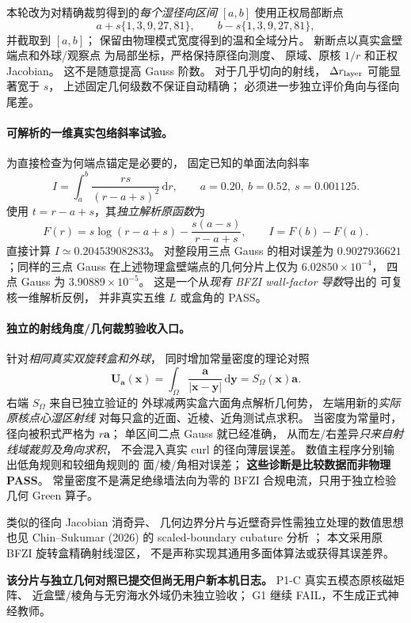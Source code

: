 本轮改为对精确裁剪得到的\emph{每个湿径向区间}
$[a,b]$ 使用正权局部断点
\[
 a+s\{1,3,9,27,81\},\qquad
 b-s\{1,3,9,27,81\},
\]
并截取到 $[a,b]$；
保留由物理模式宽度得到的温和全域分片。
新断点以真实盒壁端点和外球/观察点
为局部坐标，严格保持原径向测度、
原域、原核 $1/r$ 和正权 Jacobian。
这不是随意提高 Gauss 阶数。
对于几乎切向的射线，
$\Delta r_{\rm layer}$ 可能显著宽于 $s$，
上述固定几何级数不保证自动精确；
必须进一步独立评价角向与径向尾差。

\paragraph{可解析的一维真实包络斜率试验。}
为直接检查为何端点锚定是必要的，
固定已知的单面法向斜率
\[
 I=\int_{a}^{b}\frac{rs}{(r-a+s)^2}\,\mathrm dr,\qquad
 a=0.20,\ b=0.52,\ s=0.001125 .
\]
使用 $t=r-a+s$，其\emph{独立解析原函数}为
\[
 F(r)=s\log(r-a+s)-\frac{s(a-s)}{r-a+s},
 \qquad I=F(b)-F(a).
\]
直接计算 $I\simeq0.204539082833$。
对整段用三点 Gauss 的相对误差为
$0.9027936621$；同样的三点 Gauss
在上述物理盒壁端点的几何分片上仅为
$6.02850\times10^{-4}$，
四点 Gauss 为 $3.90889\times10^{-5}$。
这是一个从\emph{现有 BFZI wall-factor 导数}导出的
可复核一维解析反例，
并非真实五维 $L$ 或盒角的 PASS。

\paragraph{独立的射线角度/几何裁剪验收入口。}
针对\emph{相同真实双旋转盒和外球}，
同时增加常量密度的理论对照
\[
 \bm U_{\bm a}(\bm x)
 =\int_\Omega\frac{\bm a}{|\bm x-\bm y|}\,\mathrm d\bm y
 =S_\Omega(\bm x)\bm a.
\]
右端 $S_\Omega$ 来自已独立验证的
外球减两实盒六面角点解析几何势，
左端用新的\emph{实际原核点心湿区射线}
对每只盒的近面、近棱、近角测试点求积。
当密度为常量时，径向被积式严格为 $r\bm a$；
单区间二点 Gauss 就已经准确，
从而左/右差异\emph{只来自射线域裁剪及角向求积}，
不会混入真实 curl 的径向薄层误差。
数值主程序分别输出低角规则和较细角规则的
面/棱/角相对误差；
\textbf{这些诊断是比较数据而非物理 PASS}。
常量密度不是满足绝缘墙法向为零的 BFZI
合规电流，只用于独立检验几何 Green 算子。

类似的径向 Jacobian 消奇异、
几何边界分片与近壁奇异性需独立处理的数值思想
也见 Chin--Sukumar (2026) 的
scaled-boundary cubature 分析
\cite{chinsukumar2026scaled}；
本文采用原 BFZI 旋转盒精确射线湿区，
不是声称实现其通用多面体算法或获得其误差界。

\textbf{该分片与独立几何对照已提交但尚无用户新本机日志。}
P1-C 真实五模态原核磁矩阵、
近盒壁/棱角与无穷海水外域仍未独立验收；
G1 继续 FAIL，不生成正式神经教师。


